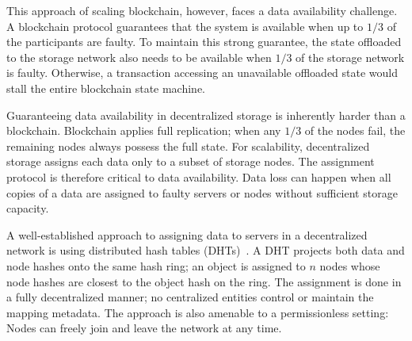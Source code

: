 This approach of scaling blockchain, however, faces a data availability challenge.
A blockchain protocol guarantees that the system is available when up to $1/3$ of the participants are faulty.
To maintain this strong guarantee, the state offloaded to the storage network also needs to be available when $1/3$ of the storage network is faulty.
Otherwise, a transaction accessing an unavailable offloaded state would stall the entire blockchain state machine.

Guaranteeing data availability in decentralized storage is inherently harder than a blockchain.
Blockchain applies full replication;
when any $1/3$ of the nodes fail, the remaining nodes always possess the full state.
For scalability, decentralized storage assigns each data only to a subset of storage nodes.
The assignment protocol is therefore critical to data availability.
Data loss can happen when all copies of a data are assigned to faulty servers or nodes without sufficient storage capacity.


A well-established approach to assigning data to servers in a decentralized network is using distributed hash tables (DHTs)~\cite{chash,chord,maymounkov2002kademlia}.
A DHT projects both data and node hashes onto the same hash ring;
an object is assigned to $n$ nodes whose node hashes are closest to the object hash on the ring.
The assignment is done in a fully decentralized manner;
no centralized entities control or maintain the mapping metadata.
The approach is also amenable to a permissionless setting: Nodes can freely join and leave the network at any time.

